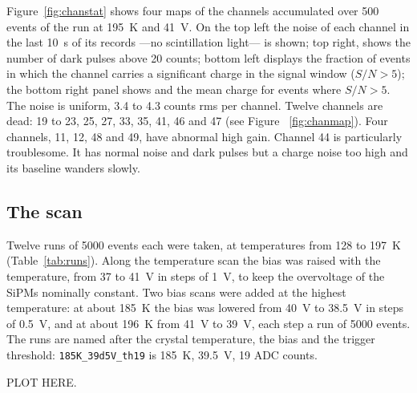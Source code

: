 \documentclass[11pt]{article}
\newcommand{\code}[1]{\texttt{#1}}
\newcommand{\us}{\textmu s\xspace}
\begin{document}
Figure~\ref{fig:chanstat} shows four maps of the channels accumulated over
500 events of the run at 195~K and 41~V. On the top left the noise of each channel in the
last 10~\us of its records ---no scintillation light--- is shown; top right, shows the
number of dark pulses above 20 counts; bottom left displays the fraction of events
in which the channel carries a significant charge in the signal
window ($S/N >5$); the bottom right panel shows and the mean charge for events where $S/N >5$.
The noise is uniform, 3.4 to 4.3 counts rms per channel.
Twelve channels are dead: 19 to 23, 25, 27, 33, 35, 41, 46 and 47
(see Figure ~\ref{fig:chanmap}). 
Four channels, 11, 12, 48 and 49, have abnormal high gain. 
Channel 44 is particularly troublesome. It has normal noise and dark pulses but a charge noise too high and its
baseline wanders slowly.

\subsection{The scan}
\label{sec:data}

Twelve runs of 5000 events each were taken, at temperatures from
128 to 197~K (Table~\ref{tab:runs}). Along the temperature scan the bias
was raised with the temperature, from 37 to 41~V in steps of 1~V, to keep
the overvoltage of the SiPMs nominally constant. Two bias scans were added
at the highest temperature: at about 185~K the bias was lowered from 40~V to 38.5~V in
steps of 0.5~V, and at about 196~K from 41~V to 39~V, each step a run of
5000 events. The runs are named after the crystal temperature, the bias and
the trigger threshold: \code{185K\_39d5V\_th19} is 185~K, 39.5~V, 19 ADC
counts.

PLOT HERE. 
\end{document}

